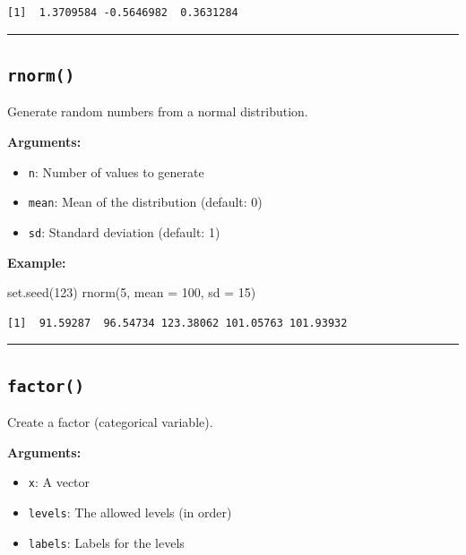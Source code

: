 \documentclass[
  letterpaper,
  DIV=11,
  numbers=noendperiod]{scrreprt}
\newenvironment{Shaded}{\begin{snugshade}}{\end{snugshade}}
\newcommand{\AttributeTok}[1]{\textcolor[rgb]{0.40,0.45,0.13}{#1}}
\newcommand{\DecValTok}[1]{\textcolor[rgb]{0.68,0.00,0.00}{#1}}
\newcommand{\FunctionTok}[1]{\textcolor[rgb]{0.28,0.35,0.67}{#1}}
\newcommand{\NormalTok}[1]{\textcolor[rgb]{0.00,0.23,0.31}{#1}}
\providecommand{\tightlist}{%
  \setlength{\itemsep}{0pt}\setlength{\parskip}{0pt}}
\begin{document}
\begin{verbatim}
[1]  1.3709584 -0.5646982  0.3631284
\end{verbatim}

\begin{center}\rule{0.5\linewidth}{0.5pt}\end{center}

\subsection{\texorpdfstring{\texttt{rnorm()}}{rnorm()}}\label{rnorm}

Generate random numbers from a normal distribution.

\textbf{Arguments:}

\begin{itemize}
\tightlist
\item
  \texttt{n}: Number of values to generate
\item
  \texttt{mean}: Mean of the distribution (default: 0)
\item
  \texttt{sd}: Standard deviation (default: 1)
\end{itemize}

\textbf{Example:}

\begin{Shaded}
\begin{Highlighting}[]
\FunctionTok{set.seed}\NormalTok{(}\DecValTok{123}\NormalTok{)}
\FunctionTok{rnorm}\NormalTok{(}\DecValTok{5}\NormalTok{, }\AttributeTok{mean =} \DecValTok{100}\NormalTok{, }\AttributeTok{sd =} \DecValTok{15}\NormalTok{)}
\end{Highlighting}
\end{Shaded}

\begin{verbatim}
[1]  91.59287  96.54734 123.38062 101.05763 101.93932
\end{verbatim}

\begin{center}\rule{0.5\linewidth}{0.5pt}\end{center}

\subsection{\texorpdfstring{\texttt{factor()}}{factor()}}\label{factor}

Create a factor (categorical variable).

\textbf{Arguments:}

\begin{itemize}
\tightlist
\item
  \texttt{x}: A vector
\item
  \texttt{levels}: The allowed levels (in order)
\item
  \texttt{labels}: Labels for the levels
\end{itemize}
\end{document}
